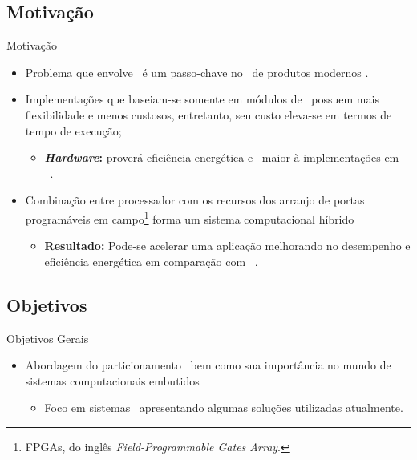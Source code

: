    \subsection{Motivação}
      \begin{frame}{Motivação} \vspace{-1em}
         \begin{itemize}
            \item Problema que envolve \codesign\ é um passo-chave no \design\ de produtos modernos \cite{Trappey2016}. 
            
            \item Implementações que baseiam-se somente em módulos de \software\ possuem mais flexibilidade e menos custosos, entretanto, seu custo eleva-se em termos de tempo de execução;
            \begin{itemize}
               \item \textbf{\textit{Hardware}:} proverá eficiência energética e \speedup\ maior à implementações em \software\ \cite{Zhang2008, Hassine2017, Wolf1994, Canis2011, Stone2010}.
            \end{itemize}
            
                  
            \item Combinação entre processador com os recursos dos arranjo de portas programáveis em campo\footnote{FPGAs, do inglês \textit{Field-Programmable Gates Array}.} forma um sistema computacional híbrido
            
            \begin{itemize}
               \item \textbf{Resultado:} Pode-se acelerar uma aplicação melhorando no desempenho e eficiência energética em comparação com \software\ \cite{Cong2009, Lo2009, Zhang2008a}. 
            \end{itemize}
            
         \end{itemize}
         
      \end{frame}
   
   
   \subsection{Objetivos}
      \begin{frame}{Objetivos Gerais}
      
         \begin{itemize}
            \item Abordagem do particionamento \hs\ bem como sua importância no mundo de sistemas computacionais embutidos
            \begin{itemize}
               \item Foco em sistemas \wearables\ apresentando algumas soluções utilizadas atualmente.
            \end{itemize}
         \end{itemize}
         
      \end{frame}
   
